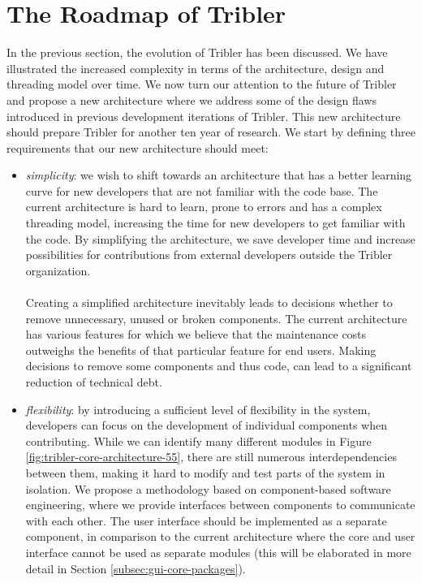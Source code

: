 \section{The Roadmap of Tribler}
\label{sec:tribler-roadmap}
In the previous section, the evolution of Tribler has been discussed. We have illustrated the increased complexity in terms of the architecture, design and threading model over time. We now turn our attention to the future of Tribler and propose a new architecture where we address some of the design flaws introduced in previous development iterations of Tribler. This new architecture should prepare Tribler for another ten year of research. We start by defining three requirements that our new architecture should meet:
\begin{itemize}
	\item \emph{simplicity}: we wish to shift towards an architecture that has a better learning curve for new developers that are not familiar with the code base. The current architecture is hard to learn, prone to errors and has a complex threading model, increasing the time for new developers to get familiar with the code. By simplifying the architecture, we save developer time and increase possibilities for contributions from external developers outside the Tribler organization.\\\\
	Creating a simplified architecture inevitably leads to decisions whether to remove unnecessary, unused or broken components. The current architecture has various features for which we believe that the maintenance costs outweighs the benefits of that particular feature for end users. Making decisions to remove some components and thus code, can lead to a significant reduction of technical debt.
	\item \emph{flexibility}: by introducing a sufficient level of flexibility in the system, developers can focus on the development of individual components when contributing. While we can identify many different modules in Figure \ref{fig:tribler-core-architecture-55}, there are still numerous interdependencies between them, making it hard to modify and test parts of the system in isolation. We propose a methodology based on component-based software engineering, where we provide interfaces between components to communicate with each other. The user interface should be implemented as a separate component, in comparison to the current architecture where the core and user interface cannot be used as separate modules (this will be elaborated in more detail in Section \ref{subsec:gui-core-packages}).

\end{itemize}
